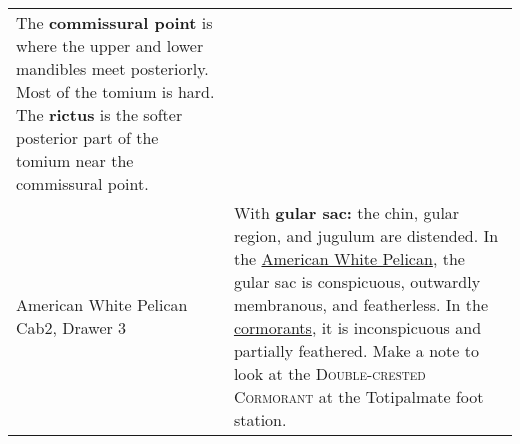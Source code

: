 \documentclass[10pt]{article}
\newif\ifprintkey
\newcommand{\PrintKey}[1]{\ifprintkey{\textbf{#1}}\fi}
\begin{document}
\begin{longtable}{@{}C{0.45\textwidth}L{0.45\textwidth}@{}}
The \textbf{commissural point} is where the upper and lower mandibles meet posteriorly. Most of the tomium is hard. The \textbf{rictus} is the softer posterior part of the tomium near the commissural point.\\ [2.5cm]
%
\PrintKey{American White Pelican \newline Cab2, Drawer 3} & With \textbf{gular sac:} the chin, gular region, and jugulum are distended. In the \href{https://www.allaboutbirds.org/guide/browse/taxonomy/Pelecanidae}{American White Pelican}, the gular sac is conspicuous, outwardly membranous, and featherless. In the \href{https://www.allaboutbirds.org/guide/browse/taxonomy/Phalacrocoracidae}{cormorants}, it is inconspicuous and partially feathered. Make a note to look at the \textsc{Double-crested Cormorant} at the Totipalmate foot station. \\ [2.5cm]



\end{longtable}
\end{document}
